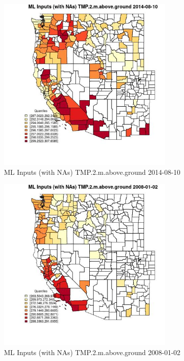 \begin{figure} 
\centering  
\includegraphics[width=0.77\textwidth]{Code_Outputs/Report_ML_input_PM25_Step4_part_e_de_duplicated_aves_compiled_2019-05-18wNAs_CountyTMP2mabovegroundMean2014-08-10_2014-08-10.jpg} 
\caption{\label{fig:Report_ML_input_PM25_Step4_part_e_de_duplicated_aves_compiled_2019-05-18wNAsCountyTMP2mabovegroundMean2014-08-10_2014-08-10}ML Inputs (with NAs) TMP.2.m.above.ground 2014-08-10} 
\end{figure} 
 

\begin{figure} 
\centering  
\includegraphics[width=0.77\textwidth]{Code_Outputs/Report_ML_input_PM25_Step4_part_e_de_duplicated_aves_compiled_2019-05-18wNAs_CountyTMP2mabovegroundMean2008-01-02_2008-01-02.jpg} 
\caption{\label{fig:Report_ML_input_PM25_Step4_part_e_de_duplicated_aves_compiled_2019-05-18wNAsCountyTMP2mabovegroundMean2008-01-02_2008-01-02}ML Inputs (with NAs) TMP.2.m.above.ground 2008-01-02} 
\end{figure} 
 

